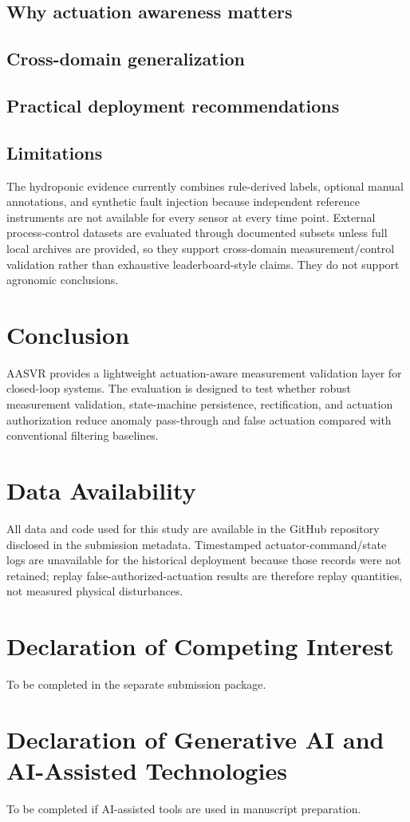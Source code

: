 \documentclass[preprint,12pt]{elsarticle}
\begin{document}
\subsection{Why actuation awareness matters}
\subsection{Cross-domain generalization}
\subsection{Practical deployment recommendations}
\subsection{Limitations}
The hydroponic evidence currently combines rule-derived labels, optional manual annotations, and synthetic fault injection because independent reference instruments are not available for every sensor at every time point. External process-control datasets are evaluated through documented subsets unless full local archives are provided, so they support cross-domain measurement/control validation rather than exhaustive leaderboard-style claims. They do not support agronomic conclusions.

\section{Conclusion}
AASVR provides a lightweight actuation-aware measurement validation layer for closed-loop systems. The evaluation is designed to test whether robust measurement validation, state-machine persistence, rectification, and actuation authorization reduce anomaly pass-through and false actuation compared with conventional filtering baselines.

\section*{Data Availability}
All data and code used for this study are available in the GitHub repository disclosed in the submission metadata. Timestamped actuator-command/state logs are unavailable for the historical deployment because those records were not retained; replay false-authorized-actuation results are therefore replay quantities, not measured physical disturbances.

\section*{Declaration of Competing Interest}
To be completed in the separate submission package.

\section*{Declaration of Generative AI and AI-Assisted Technologies}
To be completed if AI-assisted tools are used in manuscript preparation.



\end{document}
